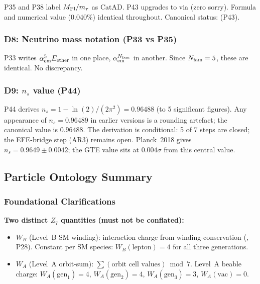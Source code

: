 \noindent P35 and P38 label $M_{\rm Pl}/m_\tau$ as CatAD.
P43 upgrades to \CatAL{} via  (zero sorry).
Formula and numerical value (0.040\%) identical throughout. Canonical status: \CatAL{} (P43).

\subsubsection*{D8: Neutrino mass notation (P33 vs P35)}

\noindent P33 writes $\alpha_{\rm em}^5 E_{\rm ether}$ in one place,
$\alpha_{\rm em}^{N_{\rm fam}}$ in another. Since $N_{\rm fam} = 5$, these are identical.
No discrepancy.

\subsubsection*{D9: $n_s$ value (P44)}

\noindent P44 derives $n_s = 1 - \ln(2)/(2\pi^2) = 0.96488$ (to 5 significant figures).
Any appearance of $n_s = 0.96489$ in earlier versions is a rounding artefact;
the canonical value is $\mathbf{0.96488}$.  The derivation is conditional: 5 of 7 steps
are closed; the EFE-bridge step (AR3) remains open.  Planck~2018 gives
$n_s = 0.9649 \pm 0.0042$; the GTE value sits at $0.004\sigma$ from this central value.

\subsection{Particle Ontology Summary}
\label{sec:mi-ontology}

\subsubsection{Foundational Clarifications}
\label{sec:mi-ontology-clarifications}

\noindent\textbf{Two distinct $Z_7$ quantities (must not be conflated):}
\begin{itemize}
\item $W_B$ (Level~B SM winding): interaction charge from winding-conservation (\CatAL, P28).
  Constant per SM species: $W_B(\text{lepton}) = 4$ for all three generations.
\item $W_A$ (Level~A orbit-sum): $\sum(\text{orbit cell values}) \bmod 7$.
  Level~A beable charge: $W_A(\text{gen}_1) = 4$, $W_A(\text{gen}_2) = 4$,
  $W_A(\text{gen}_3) = 3$, $W_A(\text{vac}) = 0$.
\end{itemize}

